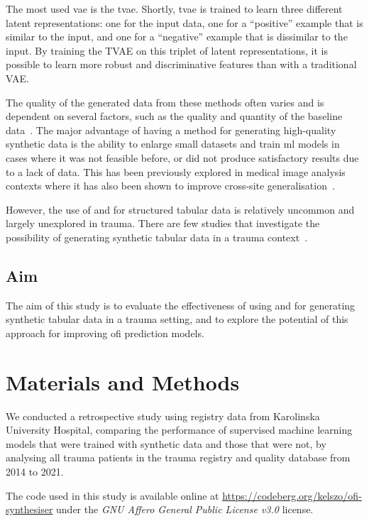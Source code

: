 \documentclass[12pt, a4paper]{article}
\begin{document}
The most used \acrshort{vae} is the \acrfull{tvae}. Shortly, \acrshort{tvae} is trained to learn three different latent
representations: one for the input data, one for a ``positive'' example that is similar to the input, and one for a
``negative'' example that is dissimilar to the input. By training the TVAE on this triplet of latent representations,
it is possible to learn more robust and discriminative features than with a traditional VAE.~\cite{ishfaq_tvae_2018}

The quality of the generated data from these methods often varies and is dependent on several factors, such as the
quality and quantity of the baseline data~\cite{karras_training_2020}. The major advantage of having a method for
generating high-quality synthetic data is the ability to enlarge small datasets and train \acrshort{ml} models in cases
where it was not feasible before, or did not produce satisfactory results due to a lack of data. This has been
previously explored in medical image analysis contexts where it has also been shown to improve cross-site
generalisation~\cite{sanaat_robust-deep_2022, bashyam_deep_2022}.

However, the use of  and  for structured tabular data is relatively uncommon and
largely unexplored in trauma. There are few studies that investigate the possibility of generating synthetic tabular
data in a trauma context~\cite{hernandez_synthetic_2022}.

\subsection{Aim}
The aim of this study is to evaluate the effectiveness of using  and  for generating
synthetic tabular data in a trauma setting, and to explore the potential of this approach for improving \acrshort{ofi}
prediction models.

\section{Materials and Methods}
We conducted a retrospective study using registry data from Karolinska University Hospital, comparing the performance
of supervised machine learning models that were trained with synthetic data and those that were not, by analysing all
trauma patients in the trauma registry and quality database from 2014 to 2021.

The code used in this study is available online at \url{https://codeberg.org/kelszo/ofi-synthesiser} under the
\textit{GNU Affero General Public License v3.0} license.
\end{document}
